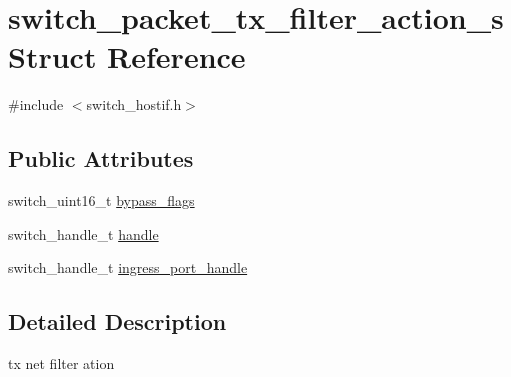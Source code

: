 \hypertarget{structswitch__packet__tx__filter__action__s}{\section{switch\+\_\+packet\+\_\+tx\+\_\+filter\+\_\+action\+\_\+s Struct Reference}
\label{structswitch__packet__tx__filter__action__s}
}


{\ttfamily \#include $<$switch\+\_\+hostif.\+h$>$}

\subsection*{Public Attributes}
\begin{DoxyCompactItemize}
\item 
switch\+\_\+uint16\+\_\+t \hyperlink{structswitch__packet__tx__filter__action__s_aaa8962d59a27c28125348cf3bff0a21b}{bypass\+\_\+flags}
\item 
switch\+\_\+handle\+\_\+t \hyperlink{structswitch__packet__tx__filter__action__s_a27412d0f230b1989a90a28a2c136cc43}{handle}
\item 
switch\+\_\+handle\+\_\+t \hyperlink{structswitch__packet__tx__filter__action__s_aa412320d344a4f8f5ab0272972c54167}{ingress\+\_\+port\+\_\+handle}
\end{DoxyCompactItemize}


\subsection{Detailed Description}
tx net filter ation 

